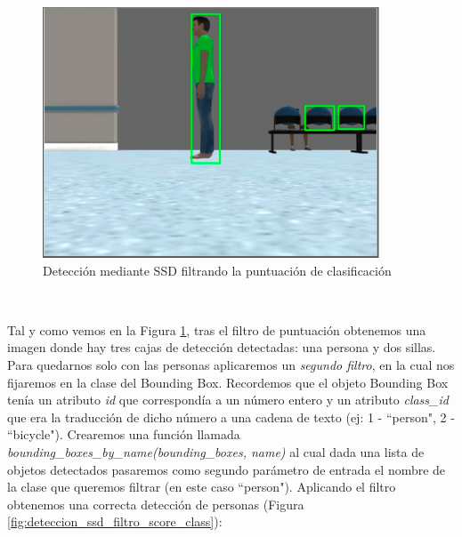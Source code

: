 \begin{figure} [H]
  \begin{center}
    \includegraphics[width=10cm]{imagenes/cap6/deteccion-ssd-filtro-score.png}
  \end{center}
  \caption[Detección mediante SSD filtrando la puntuación de clasificación]{Detección mediante SSD filtrando la puntuación de clasificación}
  \label{fig:deteccion_ssd_filtro_score}
\end{figure}\

Tal y como vemos en la Figura \ref{fig:deteccion_ssd_filtro_score}, tras el filtro de puntuación obtenemos una imagen donde hay tres cajas de detección detectadas: una persona y dos sillas. Para quedarnos solo con las personas aplicaremos un \textit{segundo filtro}, en la cual nos fijaremos en la clase del Bounding Box. Recordemos que el objeto Bounding Box tenía un atributo \textit{id} que correspondía a un número entero y un atributo \textit{class\_id} que era la traducción de dicho número a una cadena de texto (ej: 1 - ``person", 2 - ``bicycle"). Crearemos una función llamada \textit{bounding\_boxes\_by\_name(bounding\_boxes, name)} al cual dada una lista de objetos detectados pasaremos como segundo parámetro de entrada el nombre de la clase que queremos filtrar (en este caso ``person"). Aplicando el filtro obtenemos una correcta detección de personas (Figura \ref{fig:deteccion_ssd_filtro_score_class}):\\

